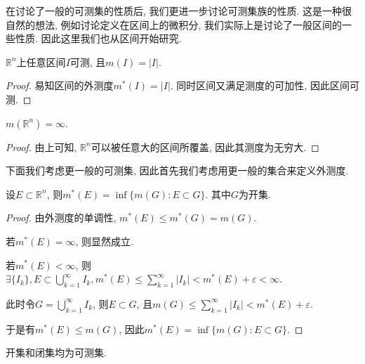 \documentclass[theorem=false,mathfont=none,openany,sub3section]{easybook}
\begin{document}
在讨论了一般的可测集的性质后, 我们更进一步讨论可测集族的性质. 这是一种很自然的想法, 例如讨论定义在区间上的微积分, 我们实际上是讨论了一般区间的一些性质. 因此这里我们也从区间开始研究.\par

\begin{theorem}
  $\mathbb{R}^n$上任意区间$I$可测, 且$m(I)=|I|$.\par
\end{theorem}

\begin{proof}
  易知区间的外测度$m^{*}(I)=|I|$. 同时区间又满足测度的可加性, 因此区间可测.\par
\end{proof}

\begin{corollary}
  $m(\mathbb{R}^n)=\infty$.\par
\end{corollary}

\begin{proof}
  由上可知, $\mathbb{R}^n$可以被任意大的区间所覆盖, 因此其测度为无穷大.\par
\end{proof}

下面我们考虑更一般的可测集, 因此首先我们考虑用更一般的集合来定义外测度.\par

\begin{lemma}
  设$E\subset \mathbb{R}^n$, 则$m^{*}(E)=\inf\{m(G): E\subset G \}$. 其中$G$为开集.\par
\end{lemma}

\begin{proof}
  由外测度的单调性, $m^{*}(E)\leqslant m^{*}(G)=m(G)$.\par
  若$m^{*}(E)=\infty$, 则显然成立.\par
  若$m^{*}(E)<\infty$, 则$\exists \{I_k\}, E\subset \bigcup_{k=1}^{\infty}I_k, m^{*}(E)\leqslant \sum_{k=1}^{\infty}|I_k|<m^{*}(E)+\varepsilon<\infty$.\par
  此时令$G=\bigcup_{k=1}^{\infty}I_k$, 则$E\subset G$, 且$m(G)\leqslant \sum_{k=1}^{\infty}|I_k|<m^{*}(E)+\varepsilon$.\par
  于是有$m^{*}(E)\leqslant m(G)$, 因此$m^{*}(E)=\inf\{m(G): E\subset G \}$.\par
\end{proof}

\begin{lemma}
  开集和闭集均为可测集.\par
\end{lemma}
\end{document}
